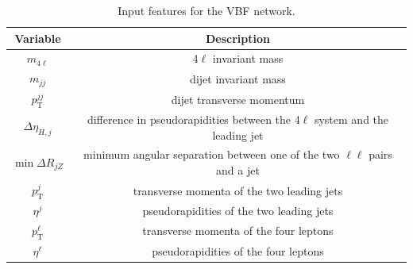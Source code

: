 \begin{table}[htbp]
        \centering
        \caption{Input features for the VBF network.}
        \label{tab:dnn_features_vbf}
        \begin{tabular}{c | c}
                \toprule
                Variable & Description \\
                \midrule
                $m_{4\ell}$ & 4$\ell$ invariant mass \\
                $m_{jj}$ & dijet invariant mass \\
                $p_\mathrm{T}^{jj}$ & dijet transverse momentum\\
                $\Delta\eta_{H,j}$ & difference in pseudorapidities between the 4$\ell$ system and the leading jet \\
                $\min \Delta R _{jZ}$ & minimum angular separation between one of the two $\ell\ell$ pairs and a jet\\
                $p_\mathrm{T}^j$ & transverse momenta of the two leading jets \\
                $\eta^j$ & pseudorapidities of the two leading jets \\
                $p_\mathrm{T}^\ell$ & transverse momenta of the four leptons \\
                $\eta^\ell$ & pseudorapidities of the four leptons  \\
                \bottomrule
        \end{tabular}
\end{table}

